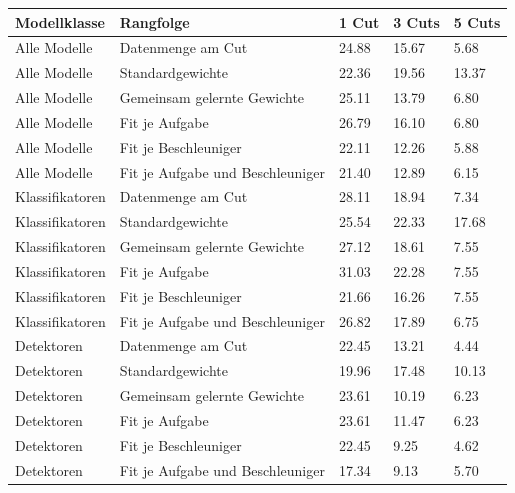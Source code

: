 \begin{tabular}{@{}lllll@{}}
\toprule
Modellklasse & Rangfolge & 1 Cut & 3 Cuts & 5 Cuts \\
\midrule
Alle Modelle & Datenmenge am Cut & 24.88 & 15.67 & 5.68 \\
Alle Modelle & Standardgewichte & 22.36 & 19.56 & 13.37 \\
Alle Modelle & Gemeinsam gelernte Gewichte & 25.11 & 13.79 & 6.80 \\
Alle Modelle & Fit je Aufgabe & 26.79 & 16.10 & 6.80 \\
Alle Modelle & Fit je Beschleuniger & 22.11 & 12.26 & 5.88 \\
Alle Modelle & Fit je Aufgabe und Beschleuniger & 21.40 & 12.89 & 6.15 \\
Klassifikatoren & Datenmenge am Cut & 28.11 & 18.94 & 7.34 \\
Klassifikatoren & Standardgewichte & 25.54 & 22.33 & 17.68 \\
Klassifikatoren & Gemeinsam gelernte Gewichte & 27.12 & 18.61 & 7.55 \\
Klassifikatoren & Fit je Aufgabe & 31.03 & 22.28 & 7.55 \\
Klassifikatoren & Fit je Beschleuniger & 21.66 & 16.26 & 7.55 \\
Klassifikatoren & Fit je Aufgabe und Beschleuniger & 26.82 & 17.89 & 6.75 \\
Detektoren & Datenmenge am Cut & 22.45 & 13.21 & 4.44 \\
Detektoren & Standardgewichte & 19.96 & 17.48 & 10.13 \\
Detektoren & Gemeinsam gelernte Gewichte & 23.61 & 10.19 & 6.23 \\
Detektoren & Fit je Aufgabe & 23.61 & 11.47 & 6.23 \\
Detektoren & Fit je Beschleuniger & 22.45 & 9.25 & 4.62 \\
Detektoren & Fit je Aufgabe und Beschleuniger & 17.34 & 9.13 & 5.70 \\
\bottomrule
\end{tabular}
